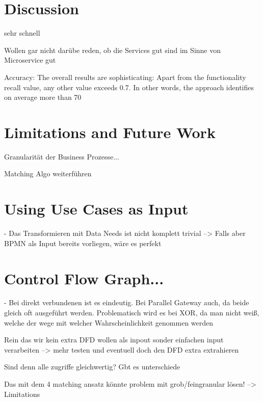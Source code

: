 \endgroup
\vspace{0.5cm}


\section{Discussion}







sehr schnell


Wollen gar nicht darübe reden, ob die Services gut sind im Sinne von Microservice gut


Accuracy:
The overall results are sophisticating: Apart from the functionality recall value, any other value exceeds 0.7. In other words, the approach identifies on average more than 70   

\section{Limitations and Future Work}
Granularität der Business Prozesse...


Matching Algo weiterführen



\section{Using Use Cases as Input}
- Das Transformieren mit Data Needs ist nicht komplett trivial --> Falls aber BPMN als Input bereits vorliegen, wäre es perfekt

\section{Control Flow Graph...}
- Bei direkt verbundenen ist es eindeutig. Bei Parallel Gateway auch, da beide gleich oft ausgeführt werden. Problematisch wird es bei XOR, da man nicht weiß, welche der wege mit welcher Wahrscheinlichkeit genommen werden



Rein das wir kein extra DFD wollen als inpout sonder einfachen input verarbeiten --> mehr testen und eventuell doch den DFD extra extrahieren


Sind denn alle zugriffe gleichwertig? Gbt es unterschiede


Das mit dem 4 matching ansatz könnte problem mit grob/feingranular lösen! --> Limitations